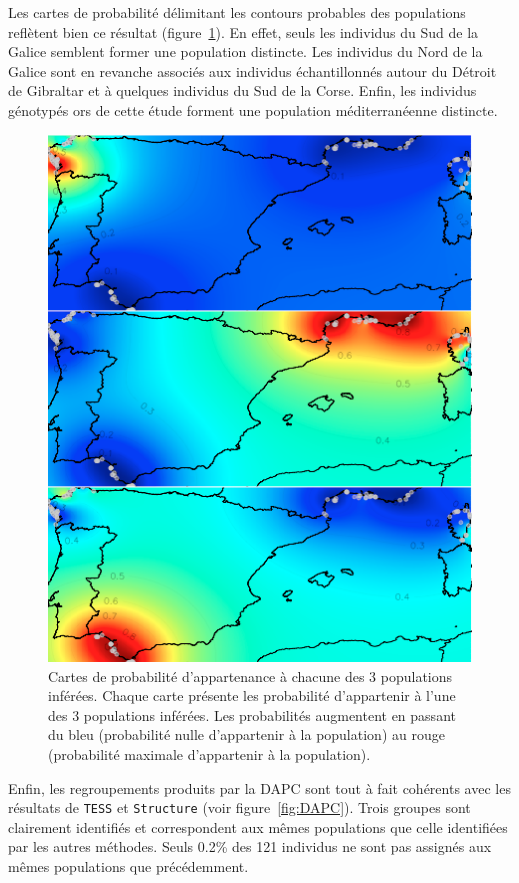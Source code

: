 \documentclass[a4paper,12pt,twoside]{article}\usepackage[]{graphicx}\usepackage[]{color}
\begin{document}
Les cartes de probabilité délimitant les contours probables des populations reflètent bien ce résultat (figure~\ref{fig:probamap}). En effet, seuls les individus du Sud de la Galice semblent former une population distincte. Les individus du Nord de la Galice sont en revanche associés aux individus échantillonnés autour du Détroit de Gibraltar et à quelques individus du Sud de la Corse. Enfin, les individus génotypés ors de cette étude forment une population méditerranéenne distincte.

\begin{figure}[htbp]
	\centering
		\includegraphics[width=.9\textwidth]{map_clusters_3}
	\caption[Cartes de probabilité d'appartenance aux populations inférées.]{Cartes de probabilité d'appartenance à chacune des 3 populations inférées. Chaque carte présente les probabilité d'appartenir à l'une des 3 populations inférées. Les probabilités augmentent en passant du bleu (probabilité nulle d'appartenir à la population) au rouge (probabilité maximale d'appartenir à la population).}
	\label{fig:probamap}
\end{figure}

Enfin, les regroupements produits par la DAPC sont tout à fait cohérents avec les résultats de \texttt{TESS} et \texttt{Structure} (voir figure~\ref{fig:DAPC}). Trois groupes sont clairement identifiés et correspondent aux mêmes populations que celle identifiées par les autres méthodes. Seuls 0.2\% des 121 individus ne sont pas assignés aux mêmes populations que précédemment.
\end{document}
